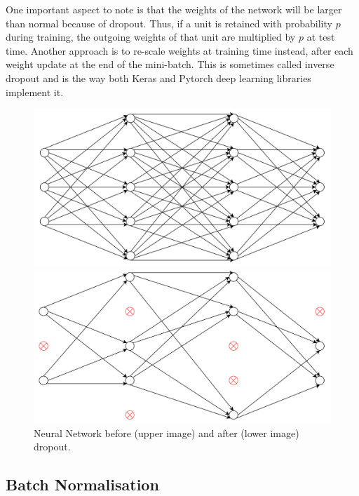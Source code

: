 One important aspect to note is that the weights of the network will be larger than normal because of dropout. Thus, if a unit is retained with probability $p$ during training, the outgoing weights of that unit are multiplied by $p$ at test
time. Another approach is to re-scale weights at training time instead, after each weight update at the end of the mini-batch. This is sometimes called inverse dropout and is the way both Keras and Pytorch deep learning libraries implement it. \\


\begin{figure}[H]
  \centering
  \includegraphics[scale=0.35]{Images/beforedrp.png}

  \bigskip

  \bigskip

  \includegraphics[scale=0.35]{Images/afterdrp.png}

  \bigskip

  \caption{Neural Network before (upper image) and after (lower image) dropout.}
  \label{dropout}
\end{figure}

\subsection{Batch Normalisation}

